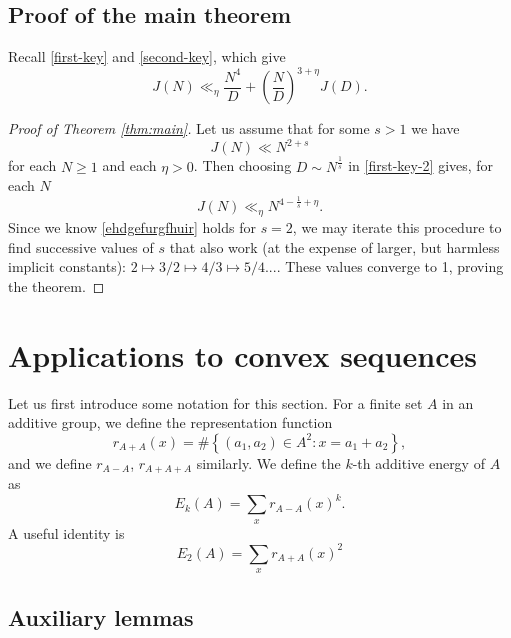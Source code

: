 \documentclass{amsart}
\numberwithin{equation}{section}
\begin{document}
\bigskip

\subsection{Proof of the main theorem}

Recall \eqref{first-key} and \eqref{second-key}, which give
\begin{equation}
    \label{first-key-2}
    J(N)\ll_\eta\frac{N^4}{D}+\left(\frac ND\right)^{3+\eta} J(D).
\end{equation}


\begin{proof}[Proof of Theorem \ref{thm:main}]
    
    Let us assume that for some $s>1$ we have
    \begin{equation}
        \label{ehdgefurgfhuir}
        J(N)\ll N^{2+s}
    \end{equation}
    for each $N\ge 1$ and each $\eta>0$. Then choosing $D\sim N^{\frac1s}$ in \eqref{first-key-2} gives, for each $N$
    \[
    J(N)\ll_\eta N^{4-\frac1{s}+\eta}.
    \]
    Since we know \eqref{ehdgefurgfhuir} holds for $s=2$, we may iterate this procedure to find successive values of $s$ that also work (at the expense of larger, but harmless implicit constants): $2\mapsto 3/2\mapsto 4/3\mapsto 5/4...$. 
    These values converge to 1, proving the theorem. 
    \qedhere
    
\end{proof}


\bigskip


\section{Applications to convex sequences}
\label{section-application}



Let us first introduce some notation for this section. For a finite set \(A\) in an additive group, we define the representation function
\[
r_{A+A} (x) = \# \left\{ (a_1,a_2) \in A ^{2} : x = a_1 + a_2  \right\},
\]
and we define \(r_{A-A} \), \(r_{A+A+A} \) similarly. We define the \(k\)-th additive energy of \(A\) as
\[
    E_{k}(A) = \sum _{x}  r_{A-A} (x)^{k}.
\]
A useful identity is
\begin{equation}
\label{eq:sum-E2}
    E_2(A) = \sum _{x} r_{A+A} (x) ^{2}
\end{equation}


\subsection{Auxiliary lemmas}
\end{document}

